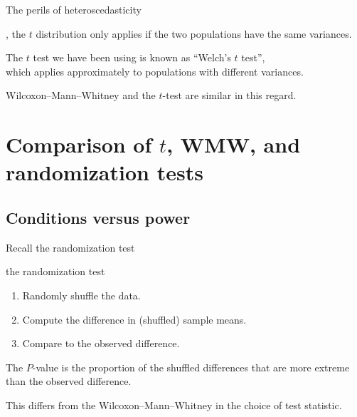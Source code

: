 \begin{frame}{The perils of heteroscedasticity}

  , the $t$ distribution only applies 
  if the two populations have the \alert{same variances}.

    \vspace{2em}

  The $t$ test we have been using is known as ``Welch's $t$ test'',\\
  which applies approximately to populations with different variances.

    \vspace{2em}

    Wilcoxon--Mann--Whitney and the $t$-test are similar in this regard.

\end{frame}


\section{Comparison of $t$, WMW, and randomization tests}

\subsection{Conditions versus power}

\begin{frame}{Recall the randomization test}

  \begin{block}{the randomization test}
    \begin{enumerate}
      \item Randomly shuffle the data.
      \item Compute the difference in (shuffled) sample means.
      \item Compare to the observed difference.
    \end{enumerate}
    The $P$-value is the proportion of the shuffled differences that are more extreme than the observed difference.
  \end{block}

    \vspace{2em}
    \pause

    This differs from the Wilcoxon--Mann--Whitney in the choice of \alert{test statistic}.

\end{frame}

